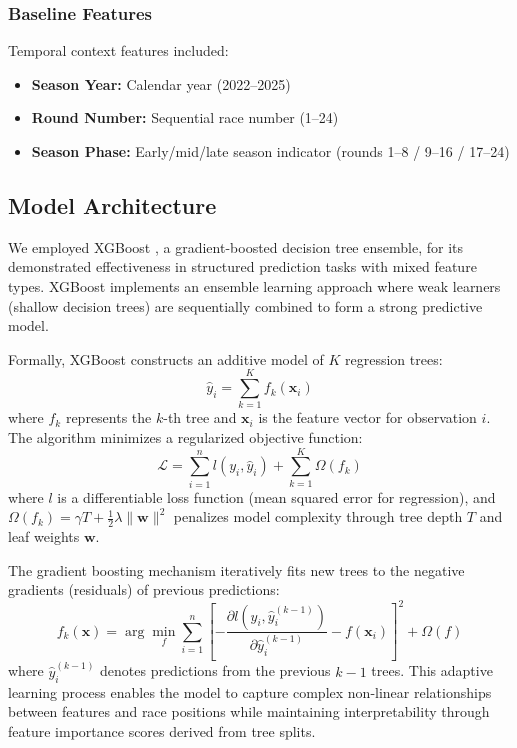 \documentclass[conference]{IEEEtran}
\begin{document}
\subsubsection{Baseline Features}

Temporal context features included:
\begin{itemize}
    \item \textbf{Season Year:} Calendar year (2022--2025)
    \item \textbf{Round Number:} Sequential race number (1--24)
    \item \textbf{Season Phase:} Early/mid/late season indicator (rounds 1--8 / 9--16 / 17--24)
\end{itemize}

\subsection{Model Architecture}

We employed XGBoost \cite{chen2016xgboost}, a gradient-boosted decision tree ensemble, for its demonstrated effectiveness in structured prediction tasks with mixed feature types. XGBoost implements an ensemble learning approach where weak learners (shallow decision trees) are sequentially combined to form a strong predictive model.

Formally, XGBoost constructs an additive model of $K$ regression trees:
\begin{equation}
\hat{y}_i = \sum_{k=1}^{K} f_k(\mathbf{x}_i)
\end{equation}
where $f_k$ represents the $k$-th tree and $\mathbf{x}_i$ is the feature vector for observation $i$. The algorithm minimizes a regularized objective function:
\begin{equation}
\mathcal{L} = \sum_{i=1}^{n} l(y_i, \hat{y}_i) + \sum_{k=1}^{K} \Omega(f_k)
\end{equation}
where $l$ is a differentiable loss function (mean squared error for regression), and $\Omega(f_k) = \gamma T + \frac{1}{2}\lambda \|\mathbf{w}\|^2$ penalizes model complexity through tree depth $T$ and leaf weights $\mathbf{w}$.

The gradient boosting mechanism iteratively fits new trees to the negative gradients (residuals) of previous predictions:
\begin{equation}
f_k(\mathbf{x}) = \arg\min_{f} \sum_{i=1}^{n} \left[-\frac{\partial l(y_i, \hat{y}_i^{(k-1)})}{\partial \hat{y}_i^{(k-1)}} - f(\mathbf{x}_i)\right]^2 + \Omega(f)
\end{equation}
where $\hat{y}_i^{(k-1)}$ denotes predictions from the previous $k-1$ trees. This adaptive learning process enables the model to capture complex non-linear relationships between features and race positions while maintaining interpretability through feature importance scores derived from tree splits.
\end{document}
